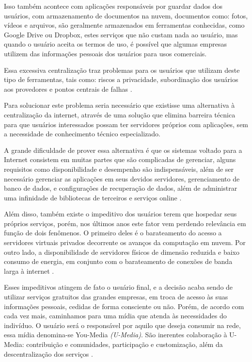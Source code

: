 Isso também acontece com aplicações responsáveis por guardar dados dos usuários,
com armazenamento de documentos na nuvem, documentos como: fotos, vídeos e arquivos, 
são geralmente armazenados em ferramentas conhecidas, como Google Drive ou Dropbox, 
estes serviços que não custam nada ao usuário, mas quando o usuário aceita os
termos de uso, é possível que algumas empresas utilizem das informações pessoais dos
usuários para usos comerciais. 

Essa excessiva centralização traz problemas para os usuários que utilizam deste
tipo de ferramentas, tais como: riscos a privacidade, subordinação dos usuários
aos provedores e pontos centrais de falhas \cite{shak2015}. 

Para solucionar este problema seria necessário que existisse uma alternativa à 
centralização da internet, através de uma solução que elimina barreira técnica 
para que usuários interessados possam ter servidores próprios com aplicações, 
sem a necessidade de conhecimento técnico especializado.

A grande dificuldade de prover essa alternativa é que os sistemas voltado para a
Internet consistem em muitas partes que são complicadas de gerenciar, alguns
requisitos como disponibilidade e desempenho são indispensáveis, além de ser
necessário gerenciar as aplicações em seus devidos servidores, gerenciamento de
banco de dados, e configurações de recuperação de dados, além de administrar uma
infinidade de bibliotecas de terceiros e serviços online \cite{6265084}.

Além disso, também existe o impeditivo dos usuários terem que hospedar seus próprios serviços,
porém, nos últimos anos este fator vem perdendo relevância em função de
dois fenômenos. O primeiro deles é o barateamento do acesso a servidores virtuais
privados decorrente os avanços da computação em nuvem. Por outro lado, a
disponibilidade de servidores físicos de dimensão reduzida e baixo consumo de
energia, em conjunto com o barateamento de conexões de banda larga à internet \cite{shak2015}.

Esses impeditivos atingem de fato o usuário final, e a decisão
acaba sendo de utilizar serviços gratuitos das grandes empresas, em troca de acesso
às suas informações pessoais, cedidas de forma consciente ou não. Porém, de acordo
com cada vez mais, caminhamos para uma mídia que atenda às necessidades do indivíduo. 
O usuário será o responsável por aquilo que deseja consumir na rede, essa mídia 
denomina-se You-Media \textit{(U-Media)}. São inerentes colaboração à U-Media: contribuição 
e comunidades, participação e customização, além da descentralização dos 
serviços \cite{terra2006comunicaccao}. 

